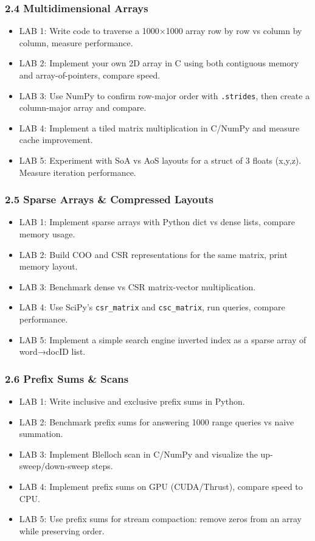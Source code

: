\documentclass[
  letterpaper,
  DIV=11,
  numbers=noendperiod]{scrreprt}
\providecommand{\tightlist}{%
  \setlength{\itemsep}{0pt}\setlength{\parskip}{0pt}}
\begin{document}
\subsubsection{2.4 Multidimensional
Arrays}\label{multidimensional-arrays-2}

\begin{itemize}
\tightlist
\item
  LAB 1: Write code to traverse a 1000×1000 array row by row vs column
  by column, measure performance.
\item
  LAB 2: Implement your own 2D array in C using both contiguous memory
  and array-of-pointers, compare speed.
\item
  LAB 3: Use NumPy to confirm row-major order with \texttt{.strides},
  then create a column-major array and compare.
\item
  LAB 4: Implement a tiled matrix multiplication in C/NumPy and measure
  cache improvement.
\item
  LAB 5: Experiment with SoA vs AoS layouts for a struct of 3 floats
  (x,y,z). Measure iteration performance.
\end{itemize}

\subsubsection{2.5 Sparse Arrays \& Compressed
Layouts}\label{sparse-arrays-compressed-layouts-1}

\begin{itemize}
\tightlist
\item
  LAB 1: Implement sparse arrays with Python dict vs dense lists,
  compare memory usage.
\item
  LAB 2: Build COO and CSR representations for the same matrix, print
  memory layout.
\item
  LAB 3: Benchmark dense vs CSR matrix-vector multiplication.
\item
  LAB 4: Use SciPy's \texttt{csr\_matrix} and \texttt{csc\_matrix}, run
  queries, compare performance.
\item
  LAB 5: Implement a simple search engine inverted index as a sparse
  array of word→docID list.
\end{itemize}

\subsubsection{2.6 Prefix Sums \& Scans}\label{prefix-sums-scans-2}

\begin{itemize}
\tightlist
\item
  LAB 1: Write inclusive and exclusive prefix sums in Python.
\item
  LAB 2: Benchmark prefix sums for answering 1000 range queries vs naive
  summation.
\item
  LAB 3: Implement Blelloch scan in C/NumPy and visualize the
  up-sweep/down-sweep steps.
\item
  LAB 4: Implement prefix sums on GPU (CUDA/Thrust), compare speed to
  CPU.
\item
  LAB 5: Use prefix sums for stream compaction: remove zeros from an
  array while preserving order.
\end{itemize}
\end{document}
